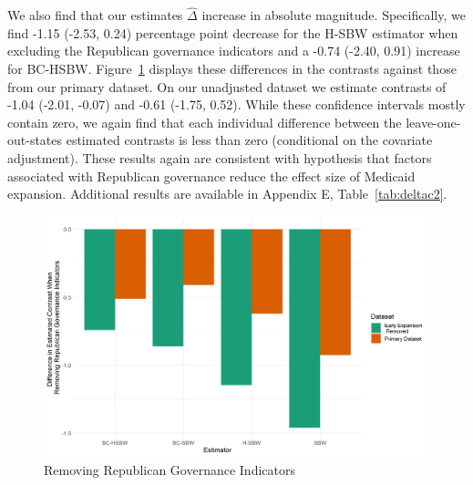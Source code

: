 \documentclass[12pt]{article}
\begin{document}
We also find that our estimates $\hat{\Delta}$ increase in absolute magnitude. Specifically, we find -1.15 (-2.53, 0.24) percentage point decrease for the H-SBW estimator when excluding the Republican governance indicators and a -0.74 (-2.40, 0.91) increase for BC-HSBW. Figure~\ref{fig:repub} displays these differences in the contrasts against those from our primary dataset. On our unadjusted dataset we estimate contrasts of -1.04 (-2.01, -0.07) and -0.61 (-1.75, 0.52). While these confidence intervals mostly contain zero, we again find that each individual difference between the leave-one-out-states estimated contrasts is less than zero (conditional on the covariate adjustment). These results again are consistent with hypothesis that factors associated with Republican governance reduce the effect size of Medicaid expansion. Additional results are available in Appendix E, Table~\ref{tab:deltac2}. 

\begin{figure}[]
\begin{center}
    \includegraphics[scale=0.6]{01_Plots/repub-diff-c1c2.png}
    \caption{Removing Republican Governance Indicators}
    \label{fig:repub}
\end{center}
\end{figure}
\end{document}
